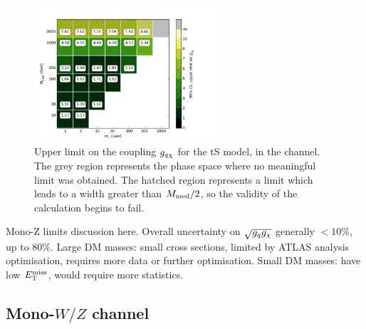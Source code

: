 \begin{figure}[h]
  \centering
    \includegraphics[width=0.6\textwidth]{figures/grid_allpoints_TSD_rat1.png}
    \caption{Upper limit on the coupling $g_{q \chi}$ for the tS model, in the \monoZ channel. The grey region represents the phase space where no meaningful limit was obtained. The hatched region represents a limit which leads to a width greater than $M_{\mathrm{med}} / 2$, so the validity of the calculation begins to fail.}
    \label{fig:MonoZ_TSD_couplinglimit}
\end{figure}

Mono-Z limits discussion here. Overall uncertainty on $\sqrt{g_q g_{\chi}}$ generally $ < 10\%$, up to 80$\%$. Large DM masses: small cross sections, limited by ATLAS analysis optimisation, requires more data or further optimisation. Small DM masses: have low $E_{\mathrm{T}}^{\mathrm{miss}}$, would require more statistics.

\subsection{Mono-$W/Z$ channel}

